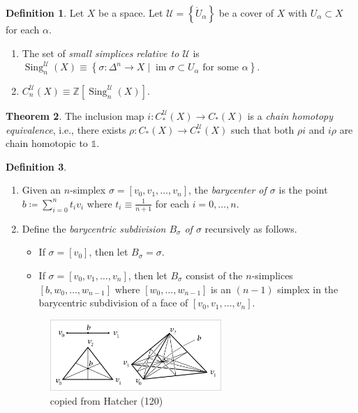 \documentclass[10pt,letterpaper,cm]{nupset}
\theoremstyle{definition}
\newtheorem{definition}{Definition}[subsection]
\theoremstyle{theorem}
\newtheorem{theorem}[definition]{Theorem}
\theoremstyle{remark}
\newcommand{\U}{\mathcal U}
\newcommand{\Z}{\mathbb Z}
\newcommand{\1}{\mathbb{1}}
\newcommand{\0}{\vec 0}
\DeclareMathOperator{\im}{im}
\DeclareMathOperator{\sing}{Sing}
\begin{document}
\begin{definition} Let $X$ be a space. Let $\mathcal{U} =\left\{\mathring{U}_{\alpha}\right\}$ be a cover of $X$ with $U_{\alpha} \subset X$ for each $\alpha$.
\begin{enumerate}
\item The set of  \textit{small simplices relative to $\U$} is $\sing_n^{\U}(X) \equiv \left\{\sigma : \Delta^n  \to X \mid \im{\sigma}\subset U_{\alpha} \text{ for some }\alpha\right\}$.
\item $C_n^{\U}(X) \equiv\Z\left[\sing_n^{\U}(X)\right]$.
\end{enumerate}
\end{definition}

\begin{theorem}
The inclusion map $i: C_{\ast}^{\U}(X) \to C_{\ast}(X)$ is a \textit{chain homotopy equivalence}, i.e., there exists $\rho : C_{\ast}(X) \to C_{\ast}^{\U}(X)$ such that both  $\rho i$ and  $i \rho$ are chain homotopic to $\1$.
\end{theorem}

\begin{definition} $ $
\begin{enumerate}
\item Given an $n$-simplex $\sigma = \left[v_0, v_1, \ldots, v_n\right]$, the \textit{barycenter of $\sigma$} is the point $b\coloneqq  \sum_{i=0}^n t_iv_i$ where $t_i \equiv \frac{1}{n+1}$ for each $i=0, \ldots, n$.
\item Define the \textit{barycentric subdivision $B_{\sigma}$ of $\sigma$} recursively as follows.
\begin{itemize}
\item If $\sigma = \left[v_0\right]$, then let $B_{\sigma} = \sigma$.
\item If $\sigma = \left[v_0, v_1, \ldots, v_n\right]$, then let $B_{\sigma}$ consist of the $n$-simplices $\left[b, w_0, \ldots, w_{n-1}\right]$ where $\left[w_0, \ldots, w_{n-1}\right]$ is an $\left(n-1\right)$ simplex in the barycentric subdivision of a face of $\left[v_0, v_1, \ldots, v_n\right]$.
\end{itemize}
\begin{figure}[H]
\centering
\includegraphics[width=65mm]{Hatcher-barycentric.png}
\caption{copied from Hatcher (120) \label{overflow}}
\end{figure}
\end{enumerate}
\end{definition}
\end{document}

